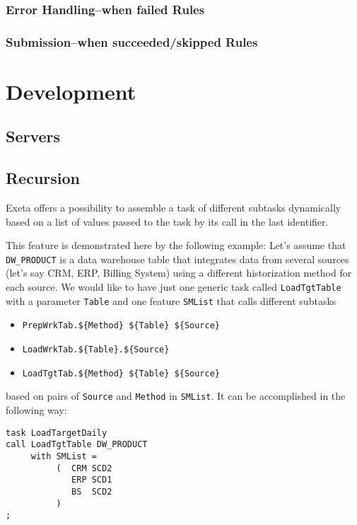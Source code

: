 \documentclass[a4paper,12pt,english,oneside]{book}
\newcommand{\exeta}{Exeta\xspace}
\begin{document}
\subsection{Error Handling--when failed Rules}
\subsection{Submission--when succeeded/skipped Rules}


\chapter{Development}

\section{Servers}

\section{Recursion}

\exeta offers a possibility to assemble a task of different subtasks dynamically based on a list of values passed to the task by its call in the last identifier.

This feature is demonstrated here by the following example: Let's assume that \verb|DW_PRODUCT| is a data warehouse table that integrates data from several sources (let's say CRM, ERP, Billing System) using a different historization method for each source. We would like to have just one generic task called \verb|LoadTgtTable| with a parameter \verb|Table| and one feature \verb|SMList| that calls different subtasks
\begin{itemize}%
\item \verb|PrepWrkTab.${Method} ${Table} ${Source}|
\item \verb|LoadWrkTab.${Table}.${Source}|
\item \verb|LoadTgtTab.${Method} ${Table} ${Source}|
\end{itemize}
based on pairs of \verb|Source| and \verb|Method| in \verb|SMList|. It can be accomplished in the following way:
\begin{verbatim}
task LoadTargetDaily
call LoadTgtTable DW_PRODUCT
     with SMList =
          (  CRM SCD2
             ERP SCD1
             BS  SCD2
          )
;
\end{verbatim}
\end{document}

